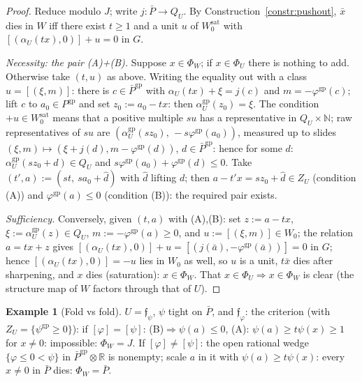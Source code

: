\documentclass[11pt]{article}
\theoremstyle{definition}
\newtheorem{example}[theorem]{Example}
\newcommand{\gp}{\mathrm{gp}}
\newcommand{\sat}{\mathrm{sat}}
\newcommand{\R}{\mathbb{R}}
\begin{document}
\begin{proof}
Reduce modulo $J$; write $j:\bar P\to Q_U$. By
Construction~\ref{constr:pushout}, $\bar x$ dies in $W$ iff there
exist $t\ge1$ and a unit $u$ of $W_0^{\sat}$ with
$[(\alpha_U(tx),0)]+u=0$ in $G$.

\emph{Necessity: the pair (A)+(B).} Suppose $x\in\Phi_W$; if
$x\in\Phi_U$ there is nothing to add. Otherwise take $(t,u)$ as
above. Writing the equality out with a class $u=[(\xi,m)]$: there
is $c\in\bar P^{\gp}$ with $\alpha_U(tx)+\xi=j(c)$ and
$m=-\varphi^{\gp}(c)$; lift $c$ to $a_0\in P^{\gp}$ and set
$z_0:=a_0-tx$: then $\alpha_U^{\gp}(z_0)=\xi$. The condition
$+u\in W_0^{\sat}$ means that a positive multiple $s u$ has a
representative in $Q_U\times\mathbb N$; raw representatives of
$s u$ are $(\alpha_U^{\gp}(s z_0),\,-s\varphi^{\gp}(a_0))$,
measured up to slides $(\xi,m)\mapsto(\xi+j(d),
m-\varphi^{\gp}(d))$, $d\in\bar P^{\gp}$: hence for some $d$:
$\alpha_U^{\gp}(s z_0+d)\in Q_U$ and
$s\varphi^{\gp}(a_0)+\varphi^{\gp}(d)\le0$. Take
$(t',a):=(s t,\ s a_0+\hat d)$ with $\hat d$ lifting $d$; then
$a-t'x=s z_0+\hat d\in Z_U$ \textup{(}condition
\textup{(A)}\textup{)} and $\varphi^{\gp}(a)\le0$
\textup{(}condition \textup{(B)}\textup{)}: the required pair
exists.

\emph{Sufficiency.} Conversely, given $(t,a)$ with (A),(B): set
$z:=a-tx$, $\xi:=\alpha_U^{\gp}(z)\in Q_U$,
$m:=-\varphi^{\gp}(a)\ge0$, and $u:=[(\xi,m)]\in W_0$; the
relation $a=tx+z$ gives
$[(\alpha_U(tx),0)]+u=[(j(\bar a),-\varphi^{\gp}(\bar a))]=0$ in
$G$; hence $[(\alpha_U(tx),0)]=-u$ lies in $W_0$ as well, so $u$
is a unit, $t\bar x$ dies after sharpening, and $x$ dies
(saturation): $x\in\Phi_W$. That
$x\in\Phi_U\Rightarrow x\in\Phi_W$ is clear (the structure map of
$W$ factors through that of $U$). \end{proof}

\begin{example}[Fold vs fold]\label{ex:ff}
$U=\mathfrak f_\psi$, $\psi$ tight on $\bar P$, and
$\mathfrak f_\varphi$: the criterion (with
$Z_U=\{\psi^{\gp}\ge0\}$): if $[\varphi]=[\psi]$:
(B)$\Rightarrow\psi(a)\le0$, (A): $\psi(a)\ge t\psi(x)\ge1$ for
$x\ne0$: impossible: $\Phi_W=J$. If $[\varphi]\ne[\psi]$: the open
rational wedge $\{\varphi\le0<\psi\}$ in $\bar P^{\gp}\otimes\R$ is
nonempty; scale $a$ in it with $\psi(a)\ge t\psi(x)$: every
$x\neq0$ in $\bar P$ dies: $\Phi_W=\bar P$.
\end{example}
\end{document}
